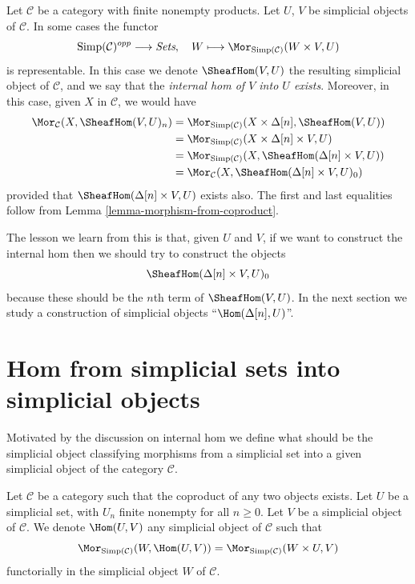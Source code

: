 \noindent
Let $\mathcal{C}$ be a category with finite nonempty
products. Let $U$, $V$ be simplicial objects of $\mathcal{C}$.
In some cases the functor
$$
\text{Simp}(\mathcal{C})^{opp} \longrightarrow \textit{Sets}, \quad
W \longmapsto \Mor_{\text{Simp}(\mathcal{C})}(W \times V, U)
$$
is representable. In this case we denote $\SheafHom(V, U)$
the resulting simplicial object of $\mathcal{C}$, and we say
that the {\it internal hom of $V$ into $U$ exists}. Moreover,
in this case, given $X$ in $\mathcal{C}$, we would have
\begin{align*}
\Mor_\mathcal{C}(X, \SheafHom(V, U)_n)
& =
\Mor_{\text{Simp}(\mathcal{C})}(X \times \Delta[n], \SheafHom(V, U)) \\
& =
\Mor_{\text{Simp}(\mathcal{C})}(X \times \Delta[n]\times V, U) \\
& =
\Mor_{\text{Simp}(\mathcal{C})}(X, \SheafHom(\Delta[n] \times V, U)) \\
& =
\Mor_\mathcal{C}(X, \SheafHom(\Delta[n] \times V, U)_0)
\end{align*}
provided that $\SheafHom(\Delta[n] \times V, U)$
exists also. The first and last equalities follow from
Lemma \ref{lemma-morphism-from-coproduct}.

\medskip\noindent
The lesson we learn from this is that, given $U$ and $V$,
if we want to construct the internal hom then we should try to
construct the objects
$$
\SheafHom(\Delta[n] \times V, U)_0
$$
because these should be the $n$th term of $\SheafHom(V, U)$.
In the next section we study a construction of simplicial objects
``$\Hom(\Delta[n], U)$''.


\section{Hom from simplicial sets into simplicial objects}
\label{section-hom-from-simplicial-sets}

\noindent
Motivated by the discussion on internal hom we define
what should be the simplicial object classifying
morphisms from a simplicial set into a given
simplicial object of the category $\mathcal{C}$.

\begin{definition}
\label{definition-hom-from-simplicial-set}
Let $\mathcal{C}$ be a category such that the coproduct
of any two objects exists.
Let $U$ be a simplicial set, with $U_n$ finite nonempty
for all $n \geq 0$.
Let $V$ be a simplicial object of $\mathcal{C}$.
We denote {\it $\Hom(U, V)$} any simplicial object of
$\mathcal{C}$ such that
$$
\Mor_{\text{Simp}(\mathcal{C})}(W, \Hom(U, V))
=
\Mor_{\text{Simp}(\mathcal{C})}(W \times U, V)
$$
functorially in the simplicial object $W$ of $\mathcal{C}$.
\end{definition}

